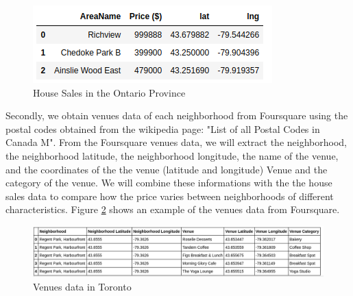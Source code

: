 \documentclass{article}
\begin{document}
\begin{figure}
	
	\includegraphics[]{hs.png}
	\caption{House Sales in the Ontario Province}
	\label{fig:hs}
	
\end{figure}

Secondly, we obtain venues data of each neighborhood from Foursquare using the postal codes obtained from the wikipedia page: "List of all Postal Codes in Canada M". From the Foursquare venues data, we will extract the neighborhood, the neighborhood latitude, the neighborhood longitude, the name of the venue, and the coordinates of the the venue (latitude and longitude)	Venue and the category of the venue. We will combine these informations with the the house sales data to compare how the price varies between neighborhoods of different characteristics. Figure \ref{fig:tv} shows an example of the venues data from Foursquare.

\begin{figure}[hbt!]
	
	\includegraphics[width=\textwidth]{tv.png}
	\caption{Venues data in Toronto}
	\label{fig:tv}
	
\end{figure}






\end{document}
